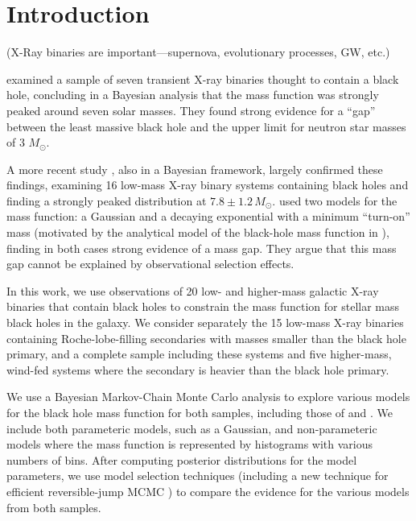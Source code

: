 \documentclass[preprint]{aastex}
\newcommand{\Msun}{M_\odot}
\begin{document}
\maketitle

\section{Introduction}
\label{sec:intro}

(X-Ray binaries are important---supernova, evolutionary processes, GW,
etc.)

\citet{Bailyn1998} examined a sample of seven transient X-ray binaries
thought to contain a black hole, concluding in a Bayesian analysis
that the mass function was strongly peaked around seven solar masses.
They found strong evidence for a ``gap'' between the least massive
black hole and the upper limit for neutron star masses of 3 $\Msun$.

A more recent study \citep{Ozel2010}, also in a Bayesian framework,
largely confirmed these findings, examining 16 low-mass X-ray binary
systems containing black holes and finding a strongly peaked
distribution at $7.8 \pm 1.2 \, \Msun$.  \citet{Ozel2010} used two
models for the mass function: a Gaussian and a decaying exponential
with a minimum ``turn-on'' mass (motivated by the analytical model of
the black-hole mass function in \citet{Fryer2001}), finding in both
cases strong evidence of a mass gap.  They argue that this mass gap
cannot be explained by observational selection effects.

In this work, we use observations of 20 low- and higher-mass galactic
X-ray binaries that contain black holes to constrain the mass function
for stellar mass black holes in the galaxy.  We consider separately
the 15 low-mass X-ray binaries containing Roche-lobe-filling
secondaries with masses smaller than the black hole primary, and a
complete sample including these systems and five higher-mass, wind-fed
systems where the secondary is heavier than the black hole primary.

We use a Bayesian Markov-Chain Monte Carlo analysis to explore various
models for the black hole mass function for both samples, including
those of \citet{Ozel2010} and \citet{Bailyn1998}.  We include both
parameteric models, such as a Gaussian, and non-parameteric models
where the mass function is represented by histograms with various
numbers of bins.  After computing posterior distributions for the
model parameters, we use model selection techniques (including a new
technique for efficient reversible-jump MCMC \citep{Farr2010}) to
compare the evidence for the various models from both samples.
\end{document}
